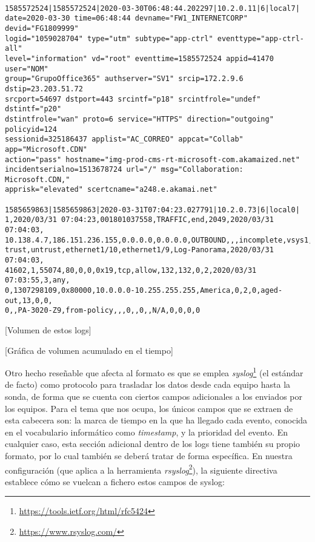 \begingroup
\makeatletter
\@totalleftmargin=-1cm
\begin{verbatim}

1585572524|1585572524|2020-03-30T06:48:44.202297|10.2.0.11|6|local7|
date=2020-03-30 time=06:48:44 devname="FW1_INTERNETCORP" devid="FG1809999"
logid="1059028704" type="utm" subtype="app-ctrl" eventtype="app-ctrl-all"
level="information" vd="root" eventtime=1585572524 appid=41470 user="NOM"
group="GrupoOffice365" authserver="SV1" srcip=172.2.9.6 dstip=23.203.51.72
srcport=54697 dstport=443 srcintf="p18" srcintfrole="undef" dstintf="p20"
dstintfrole="wan" proto=6 service="HTTPS" direction="outgoing" policyid=124
sessionid=325186437 applist="AC_CORREO" appcat="Collab" app="Microsoft.CDN"
action="pass" hostname="img-prod-cms-rt-microsoft-com.akamaized.net"
incidentserialno=1513678724 url="/" msg="Collaboration: Microsoft.CDN,"
apprisk="elevated" scertcname="a248.e.akamai.net"

1585659863|1585659863|2020-03-31T07:04:23.027791|10.2.0.73|6|local0|
1,2020/03/31 07:04:23,001801037558,TRAFFIC,end,2049,2020/03/31 07:04:03,
10.138.4.7,186.151.236.155,0.0.0.0,0.0.0.0,OUTBOUND,,,incomplete,vsys1,
trust,untrust,ethernet1/10,ethernet1/9,Log-Panorama,2020/03/31 07:04:03,
41602,1,55074,80,0,0,0x19,tcp,allow,132,132,0,2,2020/03/31 07:03:55,3,any,
0,1307298109,0x80000,10.0.0.0-10.255.255.255,America,0,2,0,aged-out,13,0,0,
0,,PA-3020-Z9,from-policy,,,0,,0,,N/A,0,0,0,0

\end{verbatim}
\endgroup

[Volumen de estos logs]

[Gráfica de volumen acumulado en el tiempo]

Otro hecho reseñable que afecta al formato es que se emplea \emph{syslog}\footnote{\url{https://tools.ietf.org/html/rfc5424}} (el estándar de facto)
como protocolo para trasladar los datos desde cada equipo hasta la sonda,
de forma que se cuenta con ciertos campos adicionales a los enviados por los equipos.
Para el tema que nos ocupa, los únicos campos que se extraen de esta cabecera son:
la marca de tiempo en la que ha llegado cada evento, conocida en el vocabulario informático como \emph{timestamp}, y la prioridad del evento.
En cualquier caso, esta sección adicional dentro de los logs tiene también su propio formato, por lo cual también se deberá tratar de forma específica.
En nuestra configuración (que aplica a la herramienta \emph{rsyslog}\footnote{\url{https://www.rsyslog.com/}}),
la siguiente directiva establece cómo se vuelcan a fichero estos campos de syslog:

